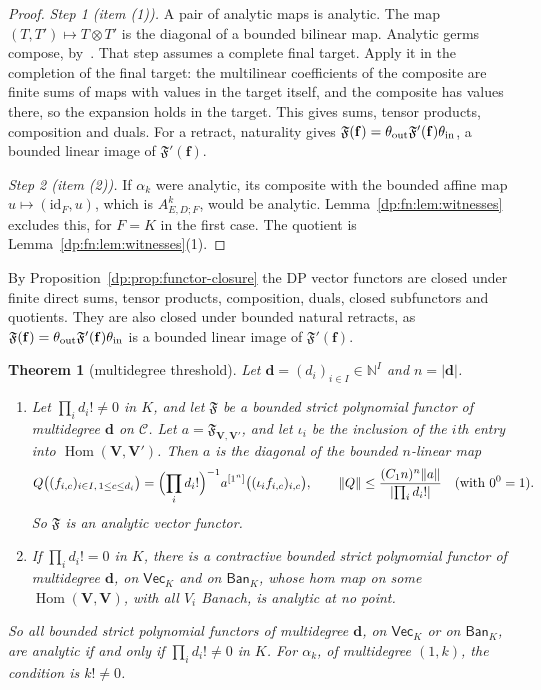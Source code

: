 \documentclass[11pt]{amsart}
\newtheorem{theorem}{Theorem}[section]
\theoremstyle{definition}
\theoremstyle{remark}
\numberwithin{equation}{section}
\newcommand{\N}{\mathbb N}
\newcommand{\id}{\mathrm{id}}
\newcommand{\abs}[1]{\lvert #1\rvert}
\newcommand{\norm}[1]{\lVert #1\rVert}
\newcommand{\cC}{\mathcal{C}}
\theoremstyle{plain}
\theoremstyle{definition}
\theoremstyle{plain}
\begin{document}
\begin{proof}
\emph{Step 1 (item (1)).} A pair of analytic maps is analytic. The map $(T,T')\mapsto T\otimes T'$ is the diagonal of a bounded bilinear map. Analytic germs compose, by~\cite[proof of Proposition~14.26, Step~1]{I}. That step assumes a complete final target. Apply it in the completion of the final target: the multilinear coefficients of the composite are finite sums of maps with values in the target itself, and the composite has values there, so the expansion holds in the target. This gives sums, tensor products, composition and duals. For a retract, naturality gives $\mathfrak F(\mathbf f)=\theta_{\rm out}\mathfrak F'(\mathbf f)\theta_{\rm in}$, a bounded linear image of $\mathfrak F'(\mathbf f)$.

\emph{Step 2 (item (2)).} If $\alpha_k$ were analytic, its composite with the bounded affine map $u\mapsto(\id_F,u)$, which is $A^k_{E,D;F}$, would be analytic. Lemma~\ref{dp:fn:lem:witnesses} excludes this, for $F=K$ in the first case. The quotient is Lemma~\ref{dp:fn:lem:witnesses}(1).
\end{proof}

By Proposition~\ref{dp:prop:functor-closure} the DP vector functors are closed under finite direct sums, tensor products, composition, duals, closed subfunctors and quotients. They are also closed under bounded natural retracts, as $\mathfrak F(\mathbf f)=\theta_{\rm out}\mathfrak F'(\mathbf f)\theta_{\rm in}$ is a bounded linear image of $\mathfrak F'(\mathbf f)$.

\begin{theorem}[multidegree threshold]\label{dp:thm:functor-threshold}
Let $\mathbf d=(d_i)_{i\in I}\in\N^I$ and $n=\abs{\mathbf d}$.
\begin{enumerate}
\item Let $\prod_id_i!\ne0$ in $K$, and let $\mathfrak F$ be a bounded strict polynomial functor of multidegree $\mathbf d$ on $\cC$. Let $a=\mathfrak F_{\mathbf V,\mathbf V'}$, and let $\iota_i$ be the inclusion of the $i$th entry into $\operatorname{Hom}(\mathbf V,\mathbf V')$. Then $a$ is the diagonal of the bounded $n$\nobreakdash-linear map
\begin{equation}\label{dp:fn:eq:lift}
 Q\bigl((f_{i,c})_{i\in I,\,1\le c\le d_i}\bigr)=\Bigl(\prod_id_i!\Bigr)^{-1}a^{[1^n]}\bigl((\iota_if_{i,c})_{i,c}\bigr),\qquad
 \norm Q\le\frac{(C_1n)^n\norm a}{\abs{\prod_id_i!}}\quad(\text{with }0^0=1).
\end{equation}
So $\mathfrak F$ is an analytic vector functor.
\item If $\prod_id_i!=0$ in $K$, there is a contractive bounded strict polynomial functor of multidegree $\mathbf d$, on $\mathsf{Vec}_K$ and on $\mathsf{Ban}_K$, whose hom map on some $\operatorname{Hom}(\mathbf V,\mathbf V)$, with all $V_i$ Banach, is analytic at no point.
\end{enumerate}
So all bounded strict polynomial functors of multidegree $\mathbf d$, on $\mathsf{Vec}_K$ or on $\mathsf{Ban}_K$, are analytic if and only if $\prod_id_i!\ne0$ in $K$. For $\alpha_k$, of multidegree $(1,k)$, the condition is $k!\ne0$.
\end{theorem}
\end{document}
